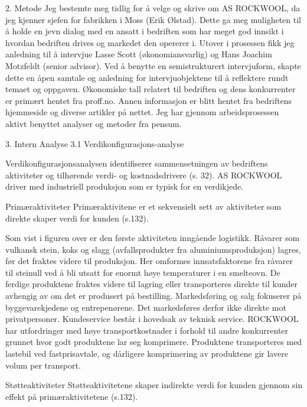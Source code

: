 2. Metode
Jeg bestemte meg tidlig for å velge og skrive om AS ROCKWOOL, da jeg kjenner sjefen for fabrikken i Moss (Erik Ølstad). Dette ga meg muligheten til å holde en jevn dialog med en ansatt i bedriften som har meget god innsikt i hvordan bedriften drives og markedet den opererer i. Utover i prosessen fikk jeg anledning til å intervjue Lasse Scott (økonomiansvarlig) og Hans Joachim Motzfeldt (senior advisor). Ved å benytte en semistrukturert intervjuform, skapte dette en åpen samtale og anledning for intervjuobjektene til å reflektere rundt temaet og oppgaven. Økonomiske tall relatert til bedriften og dens konkurrenter er primært hentet fra proff.no. Annen informasjon er blitt hentet fra bedriftens hjemmeside og diverse artikler på nettet. Jeg har gjennom arbeidsprosessen aktivt benyttet analyser og metoder fra pensum.








3. Intern Analyse
3.1 Verdikonfigurasjons-analyse

Verdikonfigurasjonsanalysen identifiserer sammensetningen av bedriftens aktiviteter og tilhørende verdi- og kostnadsdrivere (s. 32). AS ROCKWOOL driver med industriell produksjon som er typisk for en verdikjede.

Primæraktiviteter
Primæraktivitene er et sekvensielt sett av aktiviteter som direkte skaper verdi for kunden (s.132). 
  
Som vist i figuren over er den første aktiviteten inngående logistikk. Råvarer som vulkansk stein, koks og slagg (avfallsprodukter fra aluminiumsproduksjon) lagres, før det fraktes videre til produksjon. Her omformes innsatsfaktorene fra råvarer til steinull ved å bli utsatt for enormt høye temperaturer i en smelteovn. De ferdige produktene fraktes videre til lagring eller transporteres direkte til kunder avhengig av om det er produsert på bestilling. Markedsføring og salg fokuserer på byggevarekjedene og entrepenørene. Det markedsføres derfor ikke direkte mot privatpersoner. Kundeservice består i hovedsak av teknisk service.
ROCKWOOL har utfordringer med høye transportkostnader i forhold til andre konkurrenter grunnet hvor godt produktene lar seg komprimere. Produktene transporteres med lastebil ved fastprisavtale, og dårligere komprimering av produktene gir lavere volum per transport. 

Støtteaktiviteter
Støtteaktivitetene skaper indirekte verdi for kunden gjennom sin effekt på primæraktivitetene (s.132). 

